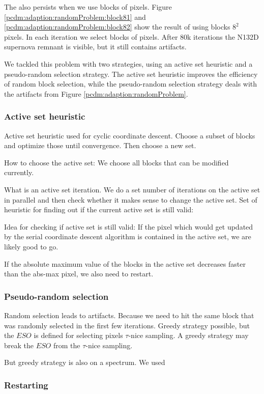 The also persists when we use blocks of pixels. Figure \ref{pcdm:adaption:randomProblem:block81} and \ref{pcdm:adaption:randomProblem:block82} show the result of using blocks $8^2$ pixels. In each iteration we select blocks of pixels. After 80k iterations the N132D supernova remnant is visible, but it still contains artifacts.

We tackled this problem with two strategies, using an active set heuristic and a pseudo-random selection strategy. The active set heuristic improves the efficiency of random block selection, while the pseudo-random selection strategy deals with the artifacts from Figure \ref{pcdm:adaption:randomProblem}.


\subsubsection{Active set heuristic}
Active set heuristic used for cyclic coordinate descent. Choose a subset of blocks and optimize those until convergence. Then choose a new set.

How to choose the active set: We choose all blocks that can be modified currently.

What is an active set iteration.
We do a set number of iterations on the active set in parallel and then check whether it makes sense to change the active set. 
Set of heuristic for finding out if the current active set is still valid:

Idea for checking if active set is still valid: If the pixel which would get updated by the serial coordinate descent algorithm is contained in the active set, we are likely good to go.

If the absolute maximum value of the blocks in the active set decreases faster than the abs-max pixel, we also need to restart.


\subsubsection{Pseudo-random selection}
Random selection leads to artifacts. Because we need to hit the same block that was randomly selected in the first few iterations. Greedy strategy possible, but the $ESO$ is defined for selecting pixels $\tau$-nice sampling. A greedy strategy may break the $ESO$ from the $\tau$-nice sampling. 

But greedy strategy is also on a spectrum. We used 


\subsubsection{Restarting}

